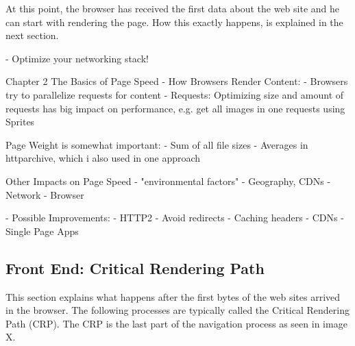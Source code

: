 
At this point, the browser has received the first data about the web site and he can start with rendering the page.
How this exactly happens, is explained in the next section.







- Optimize your networking stack!



Chapter 2 The Basics of Page Speed - How Browsers Render Content:
- Browsers try to parallelize requests for content
- Requests: Optimizing size and amount of requests has big impact on performance, e.g. get all images in one requests using Sprites

Page Weight is somewhat important:
- Sum of all file sizes
- Averages in httparchive, which i also used in one approach %

Other Impacts on Page Speed
- "environmental factors"
- Geography, CDNs
- Network
- Browser


- Possible Improvements:
- HTTP2
- Avoid redirects
- Caching headers
- CDNs
- Single Page Apps







\subsection{Front End: Critical Rendering Path}

This section explains what happens after the first bytes of the web sites arrived in the browser.
The following processes are typically called the Critical Rendering Path (CRP).
The CRP is the last part of the navigation process as seen in image X.



